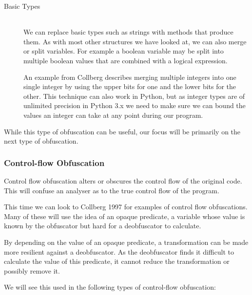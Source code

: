 \documentclass[twoside,a4paper]{report}
\begin{document}
\begin{description}
\item[Basic Types] \hfill \\
We can replace basic types such as strings with methods that produce them. As with most other structures we have looked at, we can
also merge or split variables. For example a boolean variable may be split into multiple boolean values that are combined with a
logical expression.

An example from Collberg describes merging multiple integers into one single integer by using the upper bits for one and the lower
bits for the other. This technique can also work in Python, but as integer types are of unlimited precision \cite{intprec} in Python
3.x we need to make sure we can bound the values an integer can take at any point during our program.

\end{description}

While this type of obfuscation can be useful, our focus will be primarily on the next type of obfuscation.

\subsubsection{Control-flow Obfuscation}

Control flow obfuscation alters or obscures the control flow of the original code. This will confuse an analyser as to the
true control flow of the program.

This time we can look to Collberg 1997 \cite{taxobftrans} for examples of control flow obfuscations. Many of these will use the idea
of an opaque predicate, a variable whose value is known by the obfuscator but hard for a deobfuscator to calculate.

By depending on the value of an opaque predicate, a transformation can be made more resilient against a deobfuscator. As the
deobfuscator finds it difficult to calculate the value of this predicate, it cannot reduce the transformation or possibly
remove it.

We will see this used in the following types of control-flow obfuscation:
\end{document}
